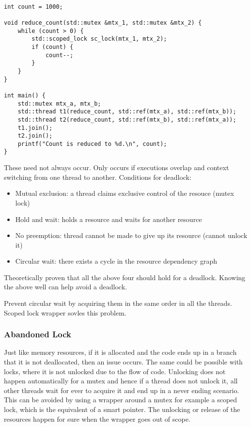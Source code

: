 \documentclass{scrartcl}
\begin{document}
\begin{verbatim}

int count = 1000;

void reduce_count(std::mutex &mtx_1, std::mutex &mtx_2) {
    while (count > 0) {
        std::scoped_lock sc_lock(mtx_1, mtx_2);
        if (count) {
            count--;
        }
    }
}

int main() {
    std::mutex mtx_a, mtx_b;
    std::thread t1(reduce_count, std::ref(mtx_a), std::ref(mtx_b));
    std::thread t2(reduce_count, std::ref(mtx_b), std::ref(mtx_a));
    t1.join();
    t2.join();
    printf("Count is reduced to %d.\n", count);
}

\end{verbatim}

These need not always occur. Only occurs if executions overlap and context switching from one thread to another. Conditions for deadlock:

\begin{itemize}
\item Mutual exclusion: a thread claims exclusive control of the resouce (mutex lock)
\item Hold and wait: holds a resource and waits for another resource
\item No preemption: thread cannot be made to give up its resource (cannot unlock it)
\item Circular wait: there exists a cycle in the resource dependency graph
\end{itemize}

Theoretically proven that all the above four should hold for a deadlock. Knowing the above well can help avoid a deadlock. 

Prevent circular wait by acquiring them in the same order in all the threads. Scoped lock wrapper sovles this problem. 

\subsubsection{Abandoned Lock}
Just like memory resources, if it is allocated and the code ends up in a branch that it is not deallocated, then an issue occurs. The same could be possible with locks, where it is not unlocked due to the flow of code. Unlocking does not happen automatically for a mutex and hence if a thread does not unlock it, all other threads wait for ever to acquire it and end up in a never ending scenario. This can be avoided by using a wrapper around a mutex for example a scoped lock, which is the equivalent of a smart pointer. The unlocking or release of the resources happen for sure when the wrapper goes out of scope.
\end{document}
